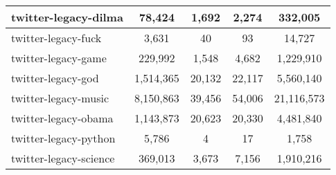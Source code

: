 \begin{center}
\begin{longtable}{| l | c | c | c | c |}
twitter-legacy-dilma & 78,424  & 1,692  & 2,274  & 332,005 \\\hline
twitter-legacy-fuck & 3,631  & 40  & 93  & 14,727 \\\hline
twitter-legacy-game & 229,992  & 1,548  & 4,682  & 1,229,910 \\\hline
twitter-legacy-god & 1,514,365  & 20,132  & 22,117  & 5,560,140 \\\hline
twitter-legacy-music & 8,150,863  & 39,456  & 54,006  & 21,116,573 \\\hline
twitter-legacy-obama & 1,143,873  & 20,623  & 20,330  & 4,481,840 \\\hline
twitter-legacy-python & 5,786  & 4  & 17  & 1,758 \\\hline
twitter-legacy-science & 369,013  & 3,673  & 7,156  & 1,910,216 \\\hline
\end{longtable}
\end{center}
